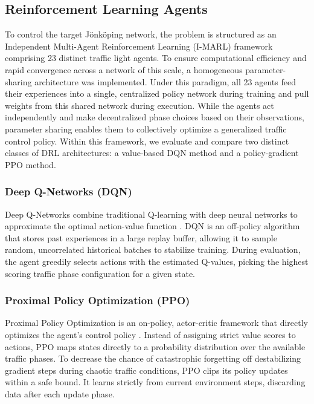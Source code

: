 \documentclass[conference]{IEEEtran}
\begin{document}
\subsection{Reinforcement Learning Agents}
To control the target Jönköping network, the problem is structured as an Independent Multi-Agent Reinforcement Learning (I-MARL) framework comprising 23 distinct traffic light agents. To ensure computational efficiency and rapid convergence across a network of this scale, a homogeneous parameter-sharing architecture was implemented. Under this paradigm, all 23 agents feed their experiences into a single, centralized policy network during training and pull weights from this shared network during execution. While the agents act independently and make decentralized phase choices based on their observations, parameter sharing enables them to collectively optimize a generalized traffic control policy. Within this framework, we evaluate and compare two distinct classes of DRL architectures: a value-based DQN method and a policy-gradient PPO method.

\subsubsection{Deep Q-Networks (DQN)}
Deep Q-Networks combine traditional Q-learning with deep neural networks to approximate the optimal action-value function \cite{dqn}. DQN is an off-policy algorithm that stores past experiences in a large replay buffer, allowing it to sample random, uncorrelated historical batches to stabilize training. During evaluation, the agent greedily selects actions with the estimated Q-values, picking the highest scoring traffic phase configuration for a given state.

\subsubsection{Proximal Policy Optimization (PPO)}
Proximal Policy Optimization is an on-policy, actor-critic framework that directly optimizes the agent's control policy \cite{ppo}. Instead of assigning strict value scores to actions, PPO maps states directly to a probability distribution over the available traffic phases. To decrease the chance of catastrophic forgetting off destabilizing gradient steps during chaotic traffic conditions, PPO clips its policy updates within a safe bound. It learns strictly from current environment steps, discarding data after each update phase.
\end{document}
